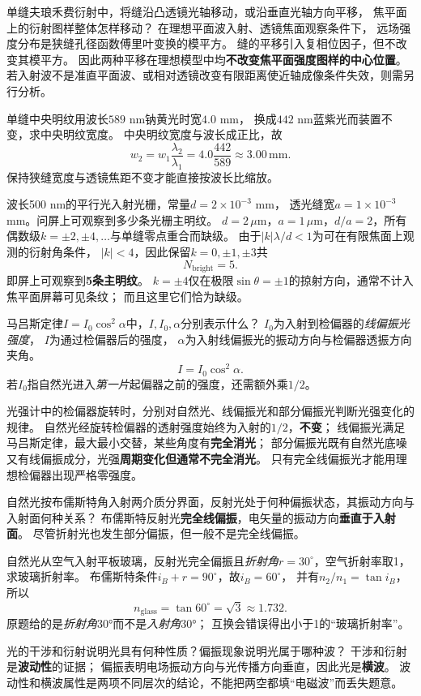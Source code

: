 \problemtext 单缝夫琅禾费衍射中，将缝沿凸透镜光轴移动，或沿垂直光轴方向平移，
焦平面上的衍射图样整体怎样移动？
\workings
在理想平面波入射、透镜焦面观察条件下，
远场强度分布是狭缝孔径函数傅里叶变换的模平方。
缝的平移引入复相位因子，但不改变其模平方。
因此两种平移在理想模型中均\textbf{不改变焦平面强度图样的中心位置}。
\crosscheck 若入射波不是准直平面波、或相对透镜改变有限距离使近轴成像条件失效，则需另行分析。

\problemtext 单缝中央明纹用波长$589$ nm钠黄光时宽$4.0$ mm，
换成$442$ nm蓝紫光而装置不变，求中央明纹宽度。
\workings
中央明纹宽度与波长成正比，故
\[
\boxed{w_2=w_1\frac{\lambda_2}{\lambda_1}
=4.0\frac{442}{589}\approx3.00\,\mathrm{mm}}.
\]
\crosscheck 保持狭缝宽度与透镜焦距不变才能直接按波长比缩放。

\problemtext 波长500 nm的平行光入射光栅，常量$d=2\times10^{-3}$ mm，
透光缝宽$a=1\times10^{-3}$ mm。问屏上可观察到多少条光栅主明纹。
\workings
$d=2\,\mu$m，$a=1\,\mu$m，$d/a=2$，所有偶数级$k=\pm2,\pm4,\ldots$与单缝零点重合而缺级。
由于$|k|\lambda/d<1$为可在有限焦面上观测的衍射角条件，
$|k|<4$，因此保留$k=0,\pm1,\pm3$共
\[
\boxed{N_{\mathrm{bright}}=5}.
\]
即屏上可观察到\textbf{5条主明纹}。
\crosscheck $k=\pm4$仅在极限$\sin\theta=\pm1$的掠射方向，通常不计入焦平面屏幕可见条纹；
而且这里它们恰为缺级。

\problemtext 马吕斯定律$I=I_0\cos^2\alpha$中，$I,I_0,\alpha$分别表示什么？
\workings
$I_0$为入射到检偏器的\emph{线偏振光强度}，
$I$为通过检偏器后的强度，
$\alpha$为入射线偏振光的振动方向与检偏器透振方向夹角。
\[
\boxed{I=I_0\cos^2\alpha}.
\]
\crosscheck 若$I_0$指自然光进入\emph{第一片}起偏器之前的强度，还需额外乘$1/2$。

\problemtext 光强计中的检偏器旋转时，分别对自然光、线偏振光和部分偏振光判断光强变化的规律。
\workings
自然光经旋转检偏器的透射强度始终为入射的$1/2$，\textbf{不变}；
线偏振光满足马吕斯定律，最大最小交替，某些角度有\textbf{完全消光}；
部分偏振光既有自然光底噪又有线偏振成分，光强\textbf{周期变化但通常不完全消光}。
\crosscheck 只有完全线偏振光才能用理想检偏器出现严格零强度。

\problemtext 自然光按布儒斯特角入射两介质分界面，反射光处于何种偏振状态，其振动方向与入射面何种关系？
\workings
布儒斯特反射光\textbf{完全线偏振}，电矢量的振动方向\textbf{垂直于入射面}。
\crosscheck 尽管折射光也发生部分偏振，但一般不是完全线偏振。

\problemtext 自然光从空气入射平板玻璃，反射光完全偏振且\emph{折射角}$r=30^\circ$，空气折射率取1，求玻璃折射率。
\workings
布儒斯特条件$i_B+r=90^\circ$，故$i_B=60^\circ$，
并有$n_2/n_1=\tan i_B$，所以
\[
\boxed{n_{\mathrm{glass}}=\tan60^\circ=\sqrt3\approx1.732}.
\]
\crosscheck 原题给的是\emph{折射角}30°而不是\emph{入射角}30°；
互换会错误得出小于1的“玻璃折射率”。

\problemtext 光的干涉和衍射说明光具有何种性质？偏振现象说明光属于哪种波？
\workings
干涉和衍射是\textbf{波动性}的证据；
偏振表明电场振动方向与光传播方向垂直，因此光是\textbf{横波}。
\crosscheck 波动性和横波属性是两项不同层次的结论，不能把两空都填“电磁波”而丢失题意。
